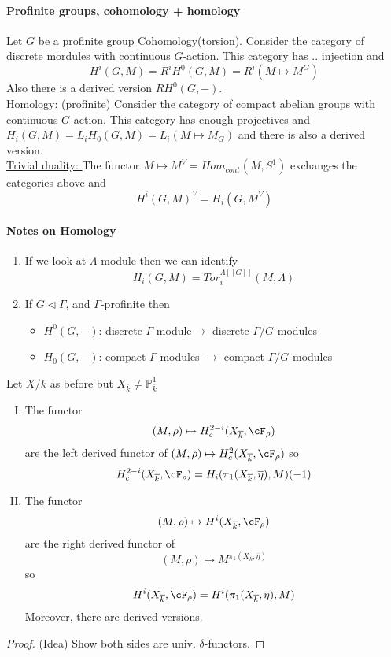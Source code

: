 \paragraph{Profinite groups, cohomology + homology} Let $G$ be a profinite group \underline{Cohomology}(torsion). Consider the category of discrete mordules with continuous $G$-action. This category has .. injection and 
	$$H^i(G, M) = R^iH^0(G, M) = R^i(M\mapsto M^G)$$
	Also there is a derived version $RH^0(G, -)$. \\

\noindent\underline{Homology: }(profinite) Consider the category of compact abelian groups with continuous $G$-action. This category has enough projectives and $H_i(G, M) = L_iH_0(G, M)=L_i(M\mapsto M_G)$ and there is also a derived version. 
\\

\noindent
\underline{Trivial duality: } The functor $M\mapsto  M^V = Hom_{cont}(M, S^1)$	 exchanges the categories above and
	$$ H^i(G, M)^V = H_i(G, M^V)$$
	
\paragraph{Notes on Homology} \begin{enumerate}[(1)] 
	\item If we look at $\Lambda$-module then we can identify
		$$H_i(G, M)=Tor_i^{\Lambda[[G]]}(M, \Lambda)$$
		
	\item If $G\vartriangleleft \Gamma$, and $\Gamma$-profinite then
		\begin{itemize}
		\item $H^0(G, -)$: discrete $\Gamma$-module$\to$ discrete $\Gamma/G$-modules
		\item $H_0(G, -)$: compact $\Gamma$-modules $\to$ compact $\Gamma/G$-modules
		\end{itemize}
	\end{enumerate}
	
\begin{prop} Let $X/k$ as before but $X_{\overline k}\neq \mathbb P^1_{\overline k}$ 
\begin{enumerate}[(I)]
	\item The functor
		$$(M, \rho)\mapsto H_c^{2-i}(X_{\overline k}, \cF_\rho)$$
		are the left derived functor of $(M, \rho)\mapsto H_c^2(X_{\overline k}, \cF_\rho)$ so
			$$H_c^{2-i}(X_{\overline k},\cF_\rho) = H_i(\pi_1(X_{\overline k}, \overline \eta), M)(-1)$$
			
	\item The functor
		$$(M, \rho)\mapsto H^i(X_{\overline k}, \cF_\rho)$$
		are the right derived functor of 
		$$(M, \rho)\mapsto M^{\pi_1(X_{\overline k}, \overline \eta)}$$
		so 
		$$H^i(X_{\overline k}, \cF_\rho) = H^i(\pi_1(X_{\overline k}, \overline \eta), M)$$
		Moreover, there are derived versions. 
\end{enumerate}
\end{prop}
\begin{proof}(Idea) Show both sides are univ. $\delta$-functors.
\end{proof}

